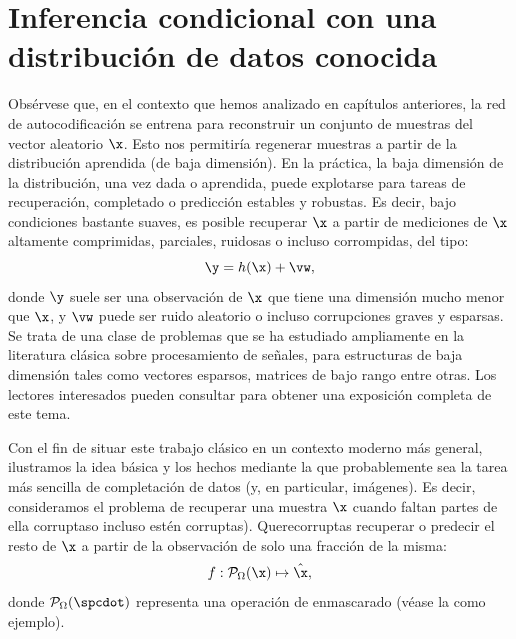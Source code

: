 \documentclass[../../book-main_es.tex]{subfiles}
\begin{document}
\section{Inferencia condicional con una distribución de datos conocida}
Obsérvese que, en el contexto que hemos analizado en capítulos anteriores, la
red de autocodificación se entrena para reconstruir un conjunto de muestras del
vector aleatorio $\x$. Esto nos permitiría regenerar muestras
a partir de la distribución aprendida (de baja dimensión). En la práctica, la
baja dimensión de la distribución, una vez dada o aprendida, puede
explotarse para tareas de recuperación, completado o predicción
estables y robustas. Es decir, bajo condiciones bastante suaves, es posible recuperar $\x$
a partir de mediciones de $\x$ altamente comprimidas, parciales, ruidosas o incluso corrompidas,
del tipo:
\begin{equation}
    \y = h(\x) + \vw,
\end{equation}
donde $\y$ suele ser una observación de $\x$ que tiene una dimensión mucho menor
que $\x$, y $\vw$ puede ser ruido aleatorio o incluso
corrupciones graves y esparsas. Se trata de una clase de problemas que se ha
estudiado ampliamente en la literatura clásica sobre procesamiento de señales,
para estructuras de baja dimensión tales como vectores esparsos, matrices de bajo rango
entre otras. Los lectores interesados pueden consultar
\cite{Wright-Ma-2022} para obtener una exposición completa de este tema.

Con el fin de situar este trabajo clásico en un contexto moderno más general,
ilustramos la idea básica y los hechos mediante la que probablemente sea la tarea más sencilla
de completación de datos (y, en particular, imágenes). Es decir,
consideramos el problema de recuperar una muestra $\x$ cuando faltan partes de ella
corruptaso incluso estén corruptas). Querecorruptas recuperar o predecir el resto de $\x$
a partir de la observación de solo una fracción de la misma:
\begin{equation}
    f: \mathcal{P}_{\Omega}(\x) \mapsto \hat{\x},
\end{equation}
donde $\mathcal{P}_{\Omega}(\spcdot)$ representa una operación de enmascarado
(véase la  como ejemplo).
\end{document}

